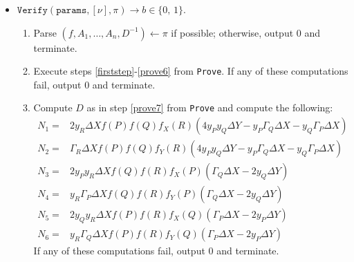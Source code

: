 \documentclass[11pt,letterpaper]{article}
\theoremstyle{definition}
\newcommand{\6}{\mathbf}
\newcommand{\7}{\mathcal}
\newcommand{\zo}{\{0, \, 1\}}
\newcommand{\non}{2 y_R \Delta X f(P)f(Q)f_X(R)(4 y_P y_Q  \Delta Y - y_P  \Gamma_Q \Delta X  - y_Q  \Gamma_P \Delta X )}
\newcommand{\ntw}{\Gamma_R \Delta X f(P)f(Q)f_Y(R)(4 y_P y_Q \Delta Y - y_P \Gamma_Q \Delta X  - y_Q \Gamma_P \Delta X )}
\newcommand{\nth}{2 y_P y_R \Delta X f(Q)f(R)f_X(P)(\Gamma_Q \Delta X - 2 y_Q \Delta Y)}
\newcommand{\nfo}{y_R \Gamma_P \Delta X f(Q)f(R)f_Y(P)(\Gamma_Q \Delta X  - 2  y_Q \Delta Y)}
\newcommand{\nfi}{2 y_Q y_R \Delta X  f(P)f(R)f_X(Q)(\Gamma_P \Delta X - 2 y_P \Delta Y) }
\newcommand{\nsi}{y_R \Gamma_Q \Delta X f(P)f(R)f_Y(Q)(\Gamma_P  \Delta X - 2  y_P \Delta Y) }
\begin{document}
\begin{itemize}
\item $\texttt{Verify}(\texttt{params}, [\nu], \pi) \to b \in \zo$.
\begin{enumerate}
\item \label{verify1} Parse $(f, A_1, \ldots, A_n, D^{-1}) \leftarrow \pi$ if possible; otherwise, output $0$ and terminate.
\item \label{verify2}  Execute steps \ref{firststep}-\ref{prove6} from \texttt{Prove}. If any of these computations fail, output $0$ and terminate.
\item  \label{verify3} Compute $D$ as in step \ref{prove7} from \texttt{Prove} and compute the following:
\begin{align*}
N_1 =& \non \\
N_2 =& \ntw \\
N_3 =& \nth \\
N_4 =& \nfo \\
N_5 =& \nfi \\
N_6 =& \nsi 
\end{align*}
If any of these computations fail, output $0$ and terminate.


\end{enumerate}
\end{itemize}
\end{document}
